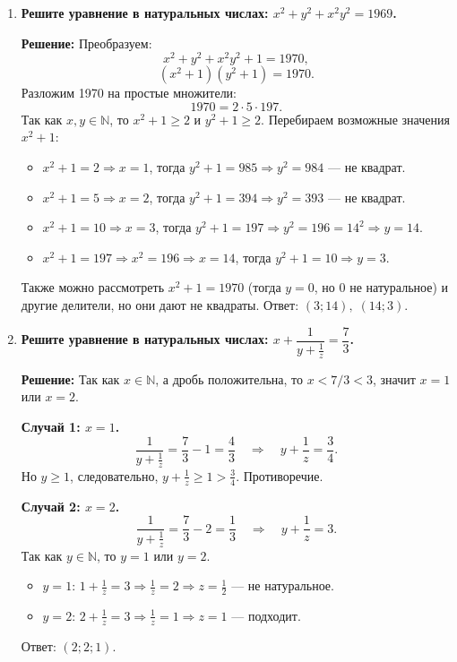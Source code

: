 \documentclass[12pt, a4paper]{article}
\begin{document}
\begin{enumerate}[label=\arabic*., wide=0pt, leftmargin=*]
\item \textbf{Решите уравнение в натуральных числах: \(x^2 + y^2 + x^2y^2 = 1969\).}

\textbf{Решение:}
Преобразуем:
\[
x^2 + y^2 + x^2y^2 + 1 = 1970,
\]
\[
(x^2 + 1)(y^2 + 1) = 1970.
\]
Разложим 1970 на простые множители:
\[
1970 = 2 \cdot 5 \cdot 197.
\]
Так как \(x, y \in \mathbb{N}\), то \(x^2 + 1 \ge 2\) и \(y^2 + 1 \ge 2\). Перебираем возможные значения \(x^2 + 1\):
\begin{itemize}
\item \(x^2 + 1 = 2 \Rightarrow x = 1\), тогда \(y^2 + 1 = 985 \Rightarrow y^2 = 984\) — не квадрат.
\item \(x^2 + 1 = 5 \Rightarrow x = 2\), тогда \(y^2 + 1 = 394 \Rightarrow y^2 = 393\) — не квадрат.
\item \(x^2 + 1 = 10 \Rightarrow x = 3\), тогда \(y^2 + 1 = 197 \Rightarrow y^2 = 196 = 14^2 \Rightarrow y = 14\).
\item \(x^2 + 1 = 197 \Rightarrow x^2 = 196 \Rightarrow x = 14\), тогда \(y^2 + 1 = 10 \Rightarrow y = 3\).
\end{itemize}
Также можно рассмотреть \(x^2+1 = 1970\) (тогда \(y=0\), но 0 не натуральное) и другие делители, но они дают не квадраты.
Ответ: \((3;14),\; (14;3)\).

\item \textbf{Решите уравнение в натуральных числах: \(x + \dfrac{1}{y + \frac{1}{z}} = \dfrac{7}{3}\).}

\textbf{Решение:}
Так как \(x \in \mathbb{N}\), а дробь положительна, то \(x < 7/3 < 3\), значит \(x = 1\) или \(x = 2\).

\textbf{Случай 1: \(x = 1\).}
\[
\frac{1}{y + \frac{1}{z}} = \frac{7}{3} - 1 = \frac{4}{3}
\quad\Rightarrow\quad
y + \frac{1}{z} = \frac{3}{4}.
\]
Но \(y \ge 1\), следовательно, \(y + \frac{1}{z} \ge 1 > \frac{3}{4}\). Противоречие.

\textbf{Случай 2: \(x = 2\).}
\[
\frac{1}{y + \frac{1}{z}} = \frac{7}{3} - 2 = \frac{1}{3}
\quad\Rightarrow\quad
y + \frac{1}{z} = 3.
\]
Так как \(y \in \mathbb{N}\), то \(y = 1\) или \(y = 2\).
\begin{itemize}
\item \(y = 1\): \(1 + \frac{1}{z} = 3 \Rightarrow \frac{1}{z} = 2 \Rightarrow z = \frac{1}{2}\) — не натуральное.
\item \(y = 2\): \(2 + \frac{1}{z} = 3 \Rightarrow \frac{1}{z} = 1 \Rightarrow z = 1\) — подходит.
\end{itemize}
Ответ: \((2;2;1)\).


\end{enumerate}
\end{document}

